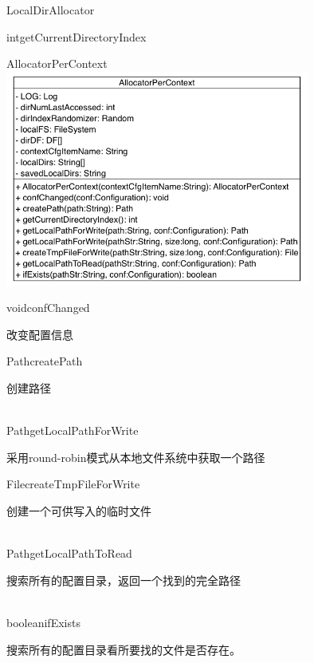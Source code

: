 \begin{XeClass}{LocalDirAllocator}
\begin{XeMethod}{}{int}{getCurrentDirectoryIndex}
    \end{XeMethod}

    \begin{XeInnerClass}{AllocatorPerContext}
\includegraphics[width=10cm]{cdig/AllocatorPerContext.png}
        
        \begin{XeMethod}{\XePrivate}{void}{confChanged}
             
 改变配置信息

        \end{XeMethod}

        \begin{XeMethod}{\XePrivate}{Path}{createPath}
             
 创建路径

        \end{XeMethod}

        \begin{XeMethod}{\XePublic \\ \XeSync}{Path}{getLocalPathForWrite}
             
 采用round-robin模式从本地文件系统中获取一个路径

        \end{XeMethod}

        \begin{XeMethod}{\XePublic}{File}{createTmpFileForWrite}
             
 创建一个可供写入的临时文件

        \end{XeMethod}

        \begin{XeMethod}{\XePublic \\ \XeSync}{Path}{getLocalPathToRead}
             
 搜索所有的配置目录，返回一个找到的完全路径

        \end{XeMethod}

        \begin{XeMethod}{\XePublic \\ \XeSync}{boolean}{ifExists}
             
 搜索所有的配置目录看所要找的文件是否存在。

        \end{XeMethod}

    \end{XeInnerClass}
\end{XeClass}
